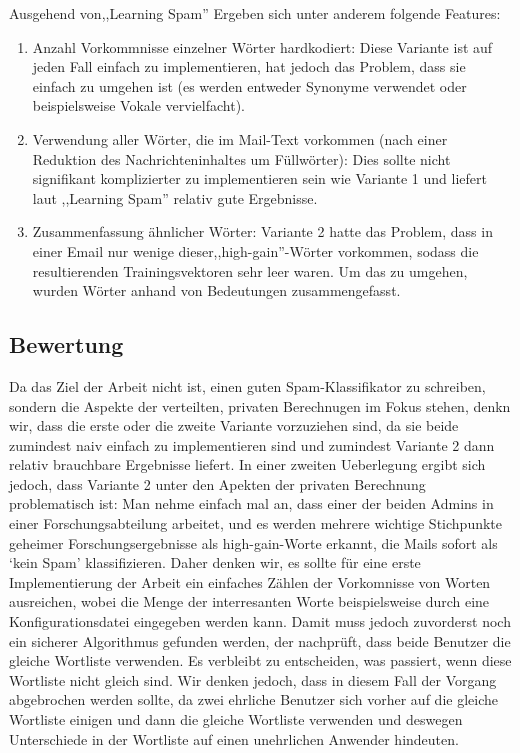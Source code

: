 \documentclass[12pt]{article}
\begin{document}
Ausgehend von,,Learning Spam'' Ergeben sich unter anderem folgende Features:
\begin{enumerate}
\item Anzahl Vorkommnisse einzelner W\"orter hardkodiert: Diese Variante ist auf
   jeden Fall einfach zu implementieren, hat jedoch das Problem, dass sie
   einfach zu umgehen ist (es werden entweder Synonyme verwendet oder
   beispielsweise Vokale vervielfacht).
\item Verwendung aller W\"orter, die im Mail-Text vorkommen (nach einer Reduktion
   des Nachrichteninhaltes um F\"ullw\"orter): Dies sollte nicht signifikant
   komplizierter zu implementieren sein wie Variante 1 und liefert laut
,,Learning Spam'' relativ gute Ergebnisse.
\item Zusammenfassung \"ahnlicher W\"orter: Variante 2 hatte das Problem, dass in
   einer Email nur wenige dieser,,high-gain''-W\"orter vorkommen, sodass die
   resultierenden Trainingsvektoren sehr leer waren. Um das zu umgehen, wurden
   W\"orter anhand von Bedeutungen zusammengefasst.
\end{enumerate}

\subsection{Bewertung}
Da das Ziel der Arbeit nicht ist, einen guten Spam-Klassifikator zu schreiben,
sondern die Aspekte der verteilten, privaten Berechnugen im Fokus stehen, denkn
wir, dass die erste oder die zweite Variante vorzuziehen sind, da sie beide
zumindest naiv einfach zu implementieren sind und zumindest Variante 2
dann relativ brauchbare Ergebnisse liefert.
In einer zweiten Ueberlegung ergibt sich jedoch, dass Variante 2 unter den
Apekten der privaten Berechnung problematisch ist: Man nehme einfach mal an,
dass einer der beiden Admins in einer Forschungsabteilung arbeitet, und es
werden mehrere wichtige Stichpunkte geheimer Forschungsergebnisse als
high-gain-Worte erkannt, die Mails sofort als `kein Spam' klassifizieren. Daher
denken wir, es sollte f\"ur eine erste Implementierung der Arbeit ein einfaches
Z\"ahlen der Vorkomnisse von Worten ausreichen, wobei die Menge der interresanten 
Worte beispielsweise durch eine Konfigurationsdatei eingegeben werden kann.
Damit muss jedoch zuvorderst noch ein sicherer Algorithmus gefunden werden, der
nachpr\"uft, dass beide Benutzer die gleiche Wortliste verwenden. Es verbleibt
zu entscheiden, was passiert, wenn diese Wortliste nicht gleich sind. Wir denken
jedoch, dass in diesem Fall der Vorgang abgebrochen werden sollte, da zwei
ehrliche Benutzer sich vorher auf die gleiche Wortliste einigen und dann die
gleiche Wortliste verwenden und deswegen Unterschiede in der Wortliste auf einen
unehrlichen Anwender hindeuten.
\end{document}
